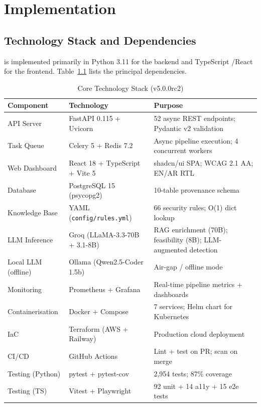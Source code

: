 \chapter{Implementation}
\label{ch:implementation}

\section{Technology Stack and Dependencies}
\label{sec:tech_stack}

\ACRQA{} is implemented primarily in Python 3.11 for the backend and TypeScript \cite{typescript_docs}/React \cite{react_docs} for the frontend. Table~\ref{tab:tech_stack} lists the principal dependencies.

\begin{table}[htbp]
\caption{Core Technology Stack (v5.0.0rc2)}
\label{tab:tech_stack}
\centering
\small
\renewcommand{\arraystretch}{1.15}
\begin{tabularx}{\textwidth}{@{} l l X @{}}
\toprule
\textbf{Component} & \textbf{Technology} & \textbf{Purpose} \\
\midrule
API Server          & FastAPI 0.115 + Uvicorn   & 52 async REST endpoints; Pydantic v2 validation \\
Task Queue          & Celery 5 + Redis 7.2      & Async pipeline execution; 4 concurrent workers \\
Web Dashboard       & React 18 + TypeScript + Vite 5 & shadcn/ui SPA; WCAG 2.1 AA; EN/AR RTL \\
Database            & PostgreSQL 15 (psycopg2)  & 10-table provenance schema \\
Knowledge Base      & YAML (\texttt{config/rules.yml}) & 66 security rules; O(1) dict lookup \\
LLM Inference       & Groq (LLaMA-3.3-70B + 3.1-8B) & RAG enrichment (70B); feasibility (8B); LLM-augmented detection \\
Local LLM (offline) & Ollama (Qwen2.5-Coder 1.5b) & Air-gap / offline mode \\
Monitoring          & Prometheus + Grafana      & Real-time pipeline metrics + dashboards \\
Containerisation    & Docker + Compose          & 7 services; Helm chart for Kubernetes \\
IaC                 & Terraform (AWS + Railway) & Production cloud deployment \\
CI/CD               & GitHub Actions            & Lint + test on PR; scan on merge \\
Testing (Python)    & pytest + pytest-cov       & 2,954 tests; 87\% coverage \\
Testing (TS)        & Vitest + Playwright       & 92 unit + 14 a11y + 15 e2e tests \\
\bottomrule
\end{tabularx}
\end{table}

